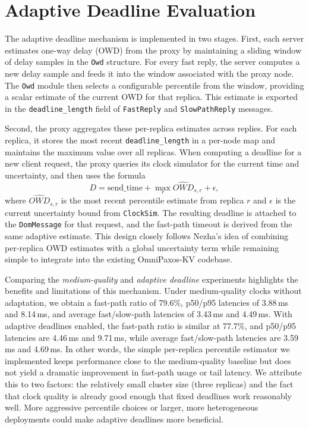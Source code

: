 \documentclass{article}
\begin{document}
\section{Adaptive Deadline Evaluation}
The adaptive deadline mechanism is implemented in two stages. First, each server estimates one-way delay (OWD) from the proxy by maintaining a sliding window of delay samples in the \texttt{Owd} structure. For every fast reply, the server computes a new delay sample and feeds it into the window associated with the proxy node. The \texttt{Owd} module then selects a configurable percentile from the window, providing a scalar estimate of the current OWD for that replica. This estimate is exported in the \texttt{deadline\_length} field of \texttt{FastReply} and \texttt{SlowPathReply} messages.

Second, the proxy aggregates these per-replica estimates across replies. For each replica, it stores the most recent \texttt{deadline\_length} in a per-node map and maintains the maximum value over all replicas. When computing a deadline for a new client request, the proxy queries its clock simulator for the current time and uncertainty, and then uses the formula
\[
D = \text{send\_time} + \max_r \widehat{OWD}_{s,r} + \epsilon,
\]
where \(\widehat{OWD}_{s,r}\) is the most recent percentile estimate from replica \(r\) and \(\epsilon\) is the current uncertainty bound from \texttt{ClockSim}. The resulting deadline is attached to the \texttt{DomMessage} for that request, and the fast-path timeout is derived from the same adaptive estimate. This design closely follows Nezha's idea of combining per-replica OWD estimates with a global uncertainty term while remaining simple to integrate into the existing OmniPaxos-KV codebase.

Comparing the \emph{medium-quality} and \emph{adaptive deadline} experiments highlights the benefits and limitations of this mechanism. Under medium-quality clocks without adaptation, we obtain a fast-path ratio of 79.6\%, p50/p95 latencies of 3.88\,ms and 8.14\,ms, and average fast/slow-path latencies of 3.43\,ms and 4.49\,ms. With adaptive deadlines enabled, the fast-path ratio is similar at 77.7\%, and p50/p95 latencies are 4.46\,ms and 9.71\,ms, while average fast/slow-path latencies are 3.59\,ms and 4.69\,ms. In other words, the simple per-replica percentile estimator we implemented keeps performance close to the medium-quality baseline but does not yield a dramatic improvement in fast-path usage or tail latency. We attribute this to two factors: the relatively small cluster size (three replicas) and the fact that clock quality is already good enough that fixed deadlines work reasonably well. More aggressive percentile choices or larger, more heterogeneous deployments could make adaptive deadlines more beneficial.
\end{document}
